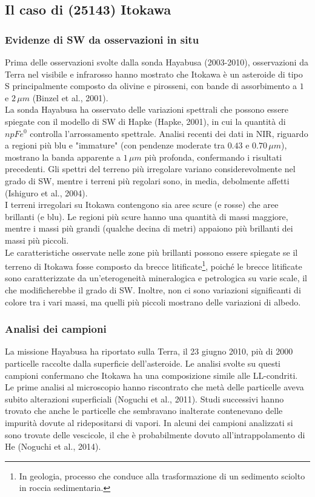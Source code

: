 \documentclass[a4paper,11pt,openright]{book}
\begin{document}
\subsection{Il caso di (25143) Itokawa}

\subsubsection{Evidenze di SW da osservazioni in situ}
Prima delle osservazioni svolte dalla sonda Hayabusa (2003-2010), osservazioni da Terra nel visibile e infrarosso hanno mostrato che Itokawa è un asteroide di tipo S principalmente composto da olivine e pirosseni, con bande di assorbimento a $1$ e $2\,\mu m$ (Binzel et al., 2001).\\
La sonda Hayabusa ha osservato delle variazioni spettrali che possono essere spiegate con il modello di SW di Hapke (Hapke, 2001), in cui la quantità di $npFe^0$ controlla l'arrossamento spettrale. Analisi recenti dei dati in NIR, riguardo a regioni più blu e "immature" (con pendenze moderate tra $0.43$ e $0.70\,\mu m$), mostrano la banda apparente a $1\,\mu m$ più profonda, confermando i risultati precedenti. Gli spettri del terreno più irregolare variano considerevolmente nel grado di SW, mentre i terreni più regolari sono, in media, debolmente affetti (Ishiguro et al., 2004).\\
I terreni irregolari su Itokawa contengono sia aree scure (e rosse) che aree brillanti (e blu). Le regioni più scure hanno una quantità di massi maggiore, mentre i massi più grandi (qualche decina di metri) appaiono più brillanti dei massi più piccoli.\\
Le caratteristiche osservate nelle zone più brillanti possono essere spiegate se il terreno di Itokawa fosse composto da brecce litificate\footnote{In geologia, processo che conduce alla trasformazione di un sedimento sciolto in roccia sedimentaria.}, poiché le brecce litificate sono caratterizzate da un'eterogeneità mineralogica e petrologica su varie scale, il che modificherebbe il grado di SW.
Inoltre, non ci sono variazioni significanti di colore tra i vari massi, ma quelli più piccoli mostrano delle variazioni di albedo.
\subsubsection{Analisi dei campioni}
La missione Hayabusa ha riportato sulla Terra, il 23 giugno 2010, più di 2000 particelle raccolte dalla superficie dell'asteroide. Le analisi svolte su questi campioni confermano che Itokawa ha una composizione simile alle LL-condriti.\\
Le prime analisi al microscopio hanno riscontrato che metà delle particelle aveva subito alterazioni superficiali (Noguchi et al., 2011). Studi successivi hanno trovato che anche le particelle che sembravano inalterate contenevano delle impurità dovute al ridepositarsi di vapori. In alcuni dei campioni analizzati si sono trovate delle vescicole, il che è probabilmente dovuto all'intrappolamento di He (Noguchi et al., 2014).
\end{document}
